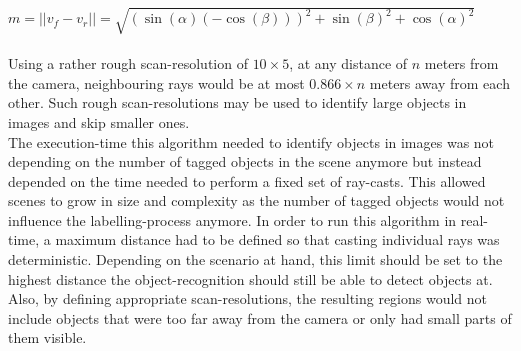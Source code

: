 $m = || v_f - v_r || = \sqrt{(\sin(\alpha) (-\cos(\beta)))^2 + \sin(\beta)^2 + \cos(\alpha)^2}$\\\\
Using a rather rough scan-resolution of $10 \times 5$, at any distance of $n$ meters from the camera, neighbouring rays would be at most $0.866 \times n$ meters away from each other. Such rough scan-resolutions may be used to identify large objects in images and skip smaller ones.\\
The execution-time this algorithm needed to identify objects in images was not depending on the number of tagged objects in the scene anymore but instead depended on the time needed to perform a fixed set of ray-casts. This allowed scenes to grow in size and complexity as the number of tagged objects would not influence the labelling-process anymore. In order to run this algorithm in real-time, a maximum distance had to be defined so that casting individual rays was deterministic. Depending on the scenario at hand, this limit should be set to the highest distance the object-recognition should still be able to detect objects at. Also, by defining appropriate scan-resolutions, the resulting regions would not include objects that were too far away from the camera or only had small parts of them visible.\\

